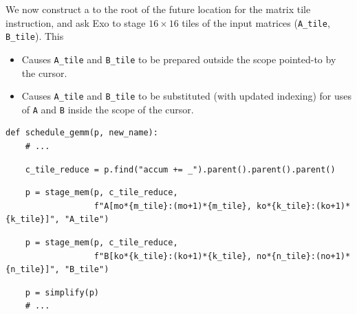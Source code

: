 \hfill
\begin{minipage}[t]{0.6\textwidth}\codeminipage
We now construct a  to the root of the future location for the matrix tile instruction,
and ask Exo to stage $16 \times 16$ tiles of the input matrices (\texttt{A\_tile}, \texttt{B\_tile}).
This
\begin{itemize}
  \item Causes \texttt{A\_tile} and \texttt{B\_tile} to be prepared outside the scope pointed-to by the cursor.
  \item Causes \texttt{A\_tile} and \texttt{B\_tile} to be substituted (with updated indexing) for uses of \texttt{A} and \texttt{B} inside the scope of the cursor.
\end{itemize}
\vspace{6mm}
{\tiny
\begin{verbatim}
def schedule_gemm(p, new_name):
    # ...
\end{verbatim}
\begin{mdframed}[style=MyFrame, backgroundcolor=blueBoxBg]
\color{blueBoxFg}
\begin{verbatim}
    c_tile_reduce = p.find("accum += _").parent().parent().parent()
\end{verbatim}
\end{mdframed}
\begin{mdframed}[style=MyFrame, backgroundcolor=yellowBoxBg]
\color{yellowBoxFg}
\begin{verbatim}
    p = stage_mem(p, c_tile_reduce,
                  f"A[mo*{m_tile}:(mo+1)*{m_tile}, ko*{k_tile}:(ko+1)*{k_tile}]", "A_tile")
\end{verbatim}
\end{mdframed}
\begin{mdframed}[style=MyFrame, backgroundcolor=greenBoxBg]
\color{greenBoxFg}
\begin{verbatim}
    p = stage_mem(p, c_tile_reduce,
                  f"B[ko*{k_tile}:(ko+1)*{k_tile}, no*{n_tile}:(no+1)*{n_tile}]", "B_tile")
\end{verbatim}
\end{mdframed}
\begin{verbatim}
    p = simplify(p)
    # ...
\end{verbatim}
}
\end{minipage}
\newpage
{}

